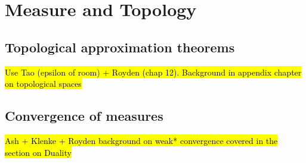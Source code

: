 
\chapter{Measure and Topology\label{chap:measureAndTopology}}

\section{Topological approximation theorems}

\hl{Use Tao (epsilon of room) + Royden (chap 12). Background in appendix chapter on topological spaces}

\section{Convergence of measures}

\hl{Ash + Klenke + Royden background on weak* convergence covered in the section on Duality}
